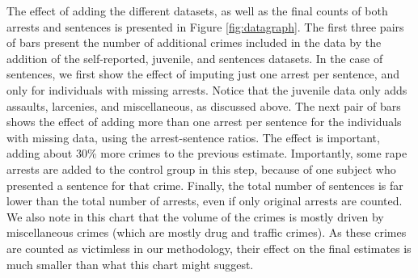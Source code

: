 \noindent The effect of adding the different datasets, as well as the final counts of both arrests and sentences is presented in Figure \ref{fig:datagraph}. The first three pairs of bars present the number of additional crimes included in the data by the addition of the self-reported, juvenile, and sentences datasets. In the case of sentences, we first show the effect of imputing just one arrest per sentence, and only for individuals with missing arrests. Notice that the juvenile data only adds assaults, larcenies, and miscellaneous, as discussed above. The next pair of bars shows the effect of adding more than one arrest per sentence for the individuals with missing data, using the arrest-sentence ratios. The effect is important, adding about 30\% more crimes to the previous estimate. Importantly, some rape arrests are added to the control group in this step, because of one subject who presented a sentence for that crime. Finally, the total number of sentences is far lower than the total number of arrests, even if only original arrests are counted. We also note in this chart that the volume of the crimes is mostly driven by miscellaneous crimes (which are mostly drug and traffic crimes). As these crimes are counted as victimless in our methodology, their effect on the final estimates is much smaller than what this chart might suggest.

